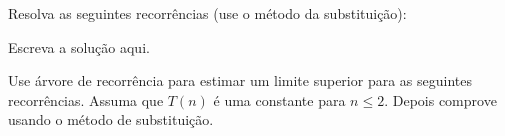 \documentclass[a4paper]{exam}
\begin{document}
\begin{questions}
\begin{solution}
  \end{solution}
  \question Resolva as seguintes recorrências (use o método da
  substituição):
  \begin{solution}
    Escreva a solução aqui.
  \end{solution}
  \question Use árvore de recorrência para estimar um limite superior
  para as seguintes recorrências. Assuma que $T(n)$ é uma constante
  para $n \leq 2$. Depois comprove usando o método de
  substituição.
\end{questions}
\end{document}

